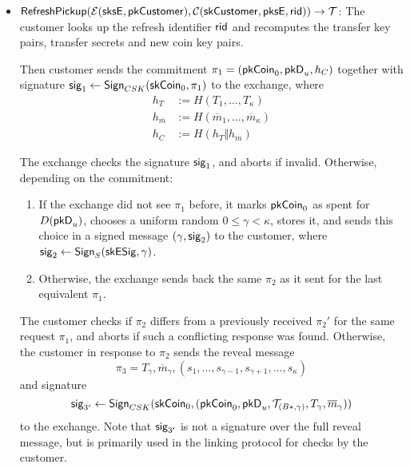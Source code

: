 \begin{itemize}
  \item $\mathsf{RefreshPickup}(\mathcal{E}(\mathsf{sksE}, \mathsf{pkCustomer}), \mathcal{C}(\mathsf{skCustomer}, \mathsf{pksE}, \mathsf{rid})) \rightarrow \mathcal{T}$:
    The customer looks up the refresh identifier $\mathsf{rid}$ and recomputes the transfer key pairs,
    transfer secrets and new coin key pairs.

    Then customer sends the commitment $\pi_1 = (\mathsf{pkCoin}_0, \mathsf{pkD}_u, h_C)$ together with signature $\mathsf{sig}_1
    \leftarrow \mathsf{Sign}_{CSK}(\mathsf{skCoin}_0, \pi_1)$ to the exchange, where
    \begin{align*}
      h_T &:= H(T_1, \dots, T_\kappa)\\
      h_{\overline{m}} &:= H(\overline{m}_1, \dots, \overline{m}_\kappa)\\
      h_C &:= H(h_T \Vert h_{\overline{m}})
    \end{align*}

    The exchange checks the signature $\mathsf{sig}_1$, and aborts if invalid.  Otherwise,
    depending on the commitment:
    \begin{enumerate}
      \item If the exchange did not see $\pi_1$ before, it marks $\mathsf{pkCoin}_0$
        as spent for $D(\mathsf{pkD}_u)$, chooses a uniform random $0 \le \gamma < \kappa$, stores it,
        and sends this choice in a signed message $(\gamma, \mathsf{sig}_2)$ to the customer,
        where $\mathsf{sig}_2 \leftarrow \mathsf{Sign}_{S}(\mathsf{skESig}, \gamma)$.
      \item Otherwise, the exchange sends back the same $\pi_2$ as it sent for the last
        equivalent $\pi_1$.
    \end{enumerate}

    The customer checks if $\pi_2$ differs from a previously received $\pi_2'$ for the same
    request $\pi_1$, and aborts if such a conflicting response was found.
    Otherwise, the customer in response to $\pi_2$ sends the reveal message
    \begin{equation*}
      \pi_3 = T_\gamma, \overline{m}_\gamma,
      (s_1, \dots, s_{\gamma-1}, s_{\gamma+1}, \dots, s_\kappa)
    \end{equation*}
    and signature
    \begin{equation*}
      \mathsf{sig}_{3'} \leftarrow \mathsf{Sign}_{CSK}(\mathsf{skCoin}_0, (\mathsf{pkCoin}_0,
      \mathsf{pkD}_u, \mathcal{T}_{(B*,\gamma)}, T_\gamma, \overline{m}_\gamma))
    \end{equation*} to the exchange.  Note that $\mathsf{sig}_{3'}$ is not a signature
    over the full reveal message, but is primarily used in the linking protocol for
    checks by the customer.
    

\end{itemize}
